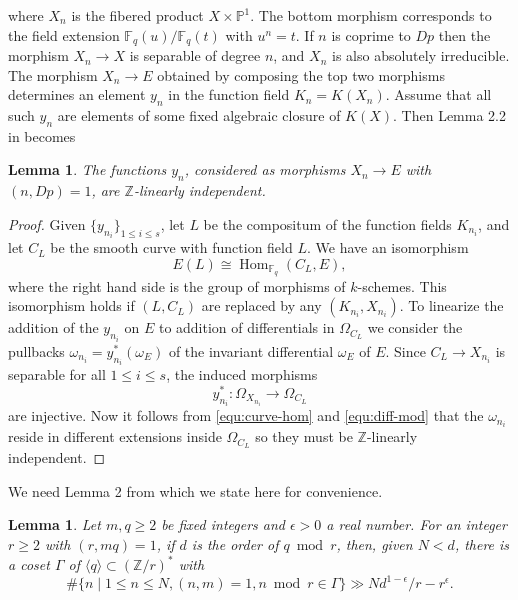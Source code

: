 \documentclass[11pt]{article}
\theoremstyle{plain}
\newtheorem{lemma}[theorem]{Lemma}
\theoremstyle{definition}
\newcommand{\ang}[1]{\langle#1\rangle}
\DeclareMathOperator{\Hom}{Hom}
\def\Z{\ensuremath{\mathbb{Z}}}
\def\F{\ensuremath{\mathbb{F}}}
\def\P{\ensuremath{\mathbb{P}}}
\begin{document}
where $X_n$ is the fibered product $X \times \P^1$. The bottom morphism corresponds to the field 
extension $\F_q(u)/\F_q(t)$ with $u^n = t$. If $n$ is coprime to $Dp$ then the morphism $X_n 
\rightarrow X$ is separable of degree $n$, and $X_n$ is also absolutely irreducible. The morphism 
$X_n \rightarrow E$ obtained by composing the top two morphisms determines an element $y_n$ in the 
function field $K_n = K(X_n)$. Assume that all such $y_n$ are elements of some fixed algebraic 
closure of $K(X)$. Then Lemma 2.2 in \cite{voloch2010} becomes
\begin{lemma}
	\label{lem:linear-ind}
	The functions $y_n$, considered as morphisms $X_n \rightarrow E$ with $(n, Dp) = 1$, are 
	$\Z$-linearly independent.
\end{lemma}
\begin{proof}
	Given $\{y_{n_i}\}_{1 \le i \le s}$, let $L$ be the compositum of the function fields $K_{n_i}$,
	and let $C_L$ be the smooth curve with function field $L$. We have an isomorphism 
	\begin{equation}
	\label{equ:curve-hom}
		E(L) \cong \Hom_{\F_q}(C_L, E),
	\end{equation}
	where the right hand side is the group of morphisms of $k$-schemes. This isomorphism holds if 
	$(L, C_L)$ are replaced by any $(K_{n_i}, X_{n_i})$. To linearize the addition of the $y_{n_i}$ 
	on $E$ to addition of differentials in $\Omega_{C_L}$ we consider the pullbacks $\omega_{n_i} = 
	y_{n_i}^*(\omega_E)$ of the invariant differential $\omega_E$ of $E$. Since $C_L \rightarrow 
	X_{n_i}$ is separable for all $1 \le i \le s$, the induced morphisms
	\begin{equation}
	\label{equ:diff-mod}
	y_{n_i}^*: \Omega_{X_{n_i}} \longrightarrow \Omega_{C_L}
	\end{equation}
	are injective. Now it follows from \eqref{equ:curve-hom} and \eqref{equ:diff-mod} that the 
	$\omega_{n_i}$ reside in different extensions inside $\Omega_{C_L}$ so they must be 
	$\Z$-linearly independent.
\end{proof}
We need Lemma 2 from \cite{voloch2007} which we state here for convenience.
\begin{lemma}
	\label{lem:coset}
	Let $m, q \ge 2$ be fixed integers and $\epsilon > 0$ a real number. For an integer $r \ge 2$ 
	with $(r, mq) = 1$, if $d$ is the order of $q \bmod r$, then, given $N < d$, there is a coset 
	$\Gamma$ of $\ang{q} \subset (\Z / r)^*$ with
	\[ \# \{ n \mid 1 \le n \le N, (n, m) = 1, n \bmod r \in \Gamma \} \gg Nd^{1 - \epsilon} / r - 
	r^\epsilon. \]
\end{lemma}
\end{document}
